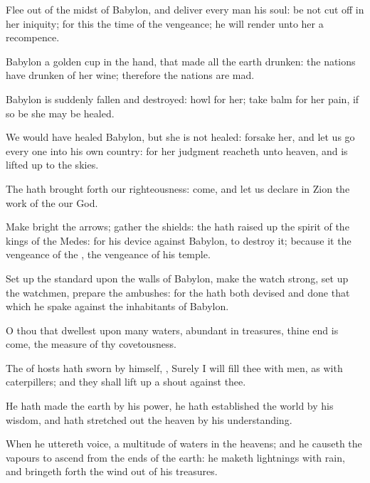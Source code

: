{Flee
out of the
midst of
Babylon, and
deliver every
man his
soul: be not cut
off in her
iniquity; for this
{} the
time of the
{}
vengeance; he will
render unto her a
recompence.

Babylon
{} a
golden
cup in the
{}
hand, that made all the
earth
drunken: the
nations have
drunken of her
wine; therefore the
nations are
mad.

Babylon is
suddenly
fallen and
destroyed:
howl for her;
take
balm for her
pain, if so be she may be
healed.

We would have
healed
Babylon, but she is not
healed:
forsake her, and let us
go every
one into his own
country: for her
judgment
reacheth unto
heaven, and is lifted
up
{} to the
skies.

The
{} hath brought
forth our
righteousness:
come, and let us
declare in
Zion the
work of the
{} our
God.

Make
bright the
arrows;
gather the
shields: the
{} hath raised
up the
spirit of the
kings of the
Medes: for his
device
{} against
Babylon, to
destroy it; because it
{} the
vengeance of the
{}, the
vengeance of his
temple.

Set
up the
standard upon the
walls of
Babylon, make the
watch
strong, set
up the
watchmen,
prepare the
ambushes: for the
{} hath both
devised and
done that which he
spake against the
inhabitants of
Babylon.

O thou that
dwellest upon
many
waters,
abundant in
treasures, thine
end is
come,
{} the
measure of thy
covetousness.

The
{} of
hosts hath
sworn by
himself,
{}, Surely I will
fill thee with
men, as with
caterpillers; and they shall lift
up a
shout against thee.

He hath
made the
earth by his
power, he hath
established the
world by his
wisdom, and hath stretched
out the
heaven by his
understanding.

When he
uttereth
{}
voice,
{} a
multitude of
waters in the
heavens; and he causeth the
vapours to
ascend from the
ends of the
earth: he
maketh
lightnings with
rain, and bringeth
forth the
wind out of his
treasures.

}
